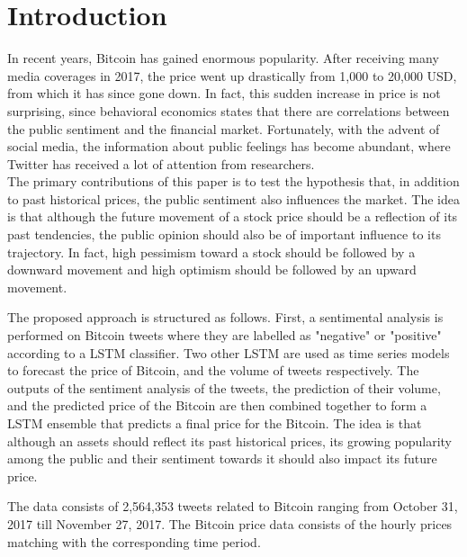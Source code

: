 \documentclass[conference]{IEEEtran}
\begin{document}
\section{Introduction}
\par In recent years, Bitcoin has gained enormous popularity. After receiving many media coverages in 2017, the price went up drastically from 1,000 to 20,000 USD, from which it has since gone down. In fact, this sudden increase in price is not surprising, since behavioral economics states that there are correlations between the public sentiment and the financial market. Fortunately, with the advent of social media, the information about public feelings has become abundant, where Twitter has received a lot of attention from researchers. \\
	The primary contributions of this paper is to test the hypothesis that, in addition to past historical prices, the public sentiment also influences the market. The idea is that although the future movement of a stock price should be a reflection of its past tendencies, the public opinion should also be of important influence to its trajectory. In fact, high pessimism toward a stock should be followed by a downward movement and high optimism should be followed by an upward movement. 
\par The proposed approach is structured as follows. First, a sentimental analysis is  performed on Bitcoin tweets where they are labelled as "negative" or "positive" according to a LSTM classifier. Two other LSTM are used as time series models to forecast the price of Bitcoin, and the volume of tweets respectively. The outputs of the sentiment analysis of the tweets, the prediction of their volume, and the predicted price of the Bitcoin are then combined together to form a LSTM ensemble that predicts a final price for the Bitcoin. The idea is that although an assets should reflect its past historical prices, its growing popularity among the public and their sentiment towards it should also impact its future price.
\par	 The data consists of 2,564,353 tweets related to Bitcoin ranging from October 31, 2017 till November 27, 2017.    The Bitcoin price data consists of the hourly prices matching with the corresponding time period.
	 
\end{document}
